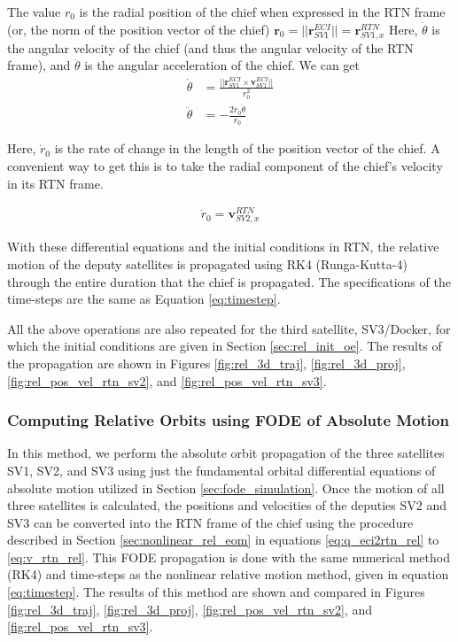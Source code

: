 The value $r_0$ is the radial position of the chief when expressed in the RTN frame (or, the norm of the position vector of the chief) $\boldsymbol{r}_0 = ||\boldsymbol{r}^{ECI}_{SV1}|| = \boldsymbol{r}^{RTN}_{SV1, x}$ 
Here, $\dot{\theta}$ is the angular velocity of the chief (and thus the angular velocity of the RTN frame), and $\ddot{\theta}$ is the angular acceleration of the chief. We can get 
\begin{align}
    \dot{\theta} &= \frac{{||\boldsymbol{r}_{SV1}^{ECI} \times \boldsymbol{v}_{SV1}^{ECI}||}}{r_0^2} \\
    \ddot{\theta} &= -\frac{2\dot{r}_0\dot{\theta}}{r_0}
\end{align}

Here, $\dot{r}_0$ is the rate of change in the length of the position vector of the chief. A convenient way to get this is to take the radial component of the chief's velocity in its RTN frame.

\begin{align}
    \dot{r}_0 = \boldsymbol{v}^{RTN}_{SV2, x}
\end{align}

With these differential equations and the initial conditions in RTN, the relative motion of the deputy satellites is propagated using RK4 (Runga-Kutta-4) through the entire duration that the chief is propagated. The specifications of the time-steps are the same as Equation \ref{eq:timestep}.

All the above operations are also repeated for the third satellite, SV3/Docker, for which the initial conditions are given in Section \ref{sec:rel_init_oe}.
The results of the propagation are shown in Figures \ref{fig:rel_3d_traj}, \ref{fig:rel_3d_proj}, \ref{fig:rel_pos_vel_rtn_sv2}, and \ref{fig:rel_pos_vel_rtn_sv3}.

\subsubsection{Computing Relative Orbits using FODE of Absolute Motion}\label{sec:rel_FODE_num_int}

In this method, we perform the absolute orbit propagation of the three satellites SV1, SV2, and SV3 using just the fundamental orbital differential equations of absolute motion utilized in Section \ref{sec:fode_simulation}. Once the motion of all three satellites is calculated, the positions and velocities of the deputies SV2 and SV3 can be converted into the RTN frame of the chief using the procedure described in Section \ref{sec:nonlinear_rel_eom} in equations \ref{eq:q_eci2rtn_rel} to \ref{eq:v_rtn_rel}. This FODE propagation is done with the same numerical method (RK4) and time-steps as the nonlinear relative motion method, given in equation \ref{eq:timestep}. The results of this method are shown and compared in Figures \ref{fig:rel_3d_traj}, \ref{fig:rel_3d_proj}, \ref{fig:rel_pos_vel_rtn_sv2}, and \ref{fig:rel_pos_vel_rtn_sv3}.


